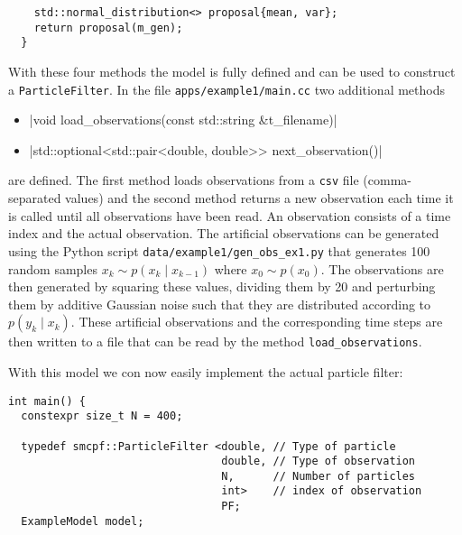 \begin{example}
\begin{verbatim}
    std::normal_distribution<> proposal{mean, var};
    return proposal(m_gen);
  }
\end{verbatim}
  With these four methods the model is fully defined and can be used
  to construct a \texttt{ParticleFilter}. In the file
  \texttt{apps/example1/main.cc} two additional methods
  \begin{itemize}
  \item {}|void load_observations(const std::string
    &t_filename)|
  \item {}|std::optional<std::pair<double, double>>
    next_observation()|
  \end{itemize}
  are defined. The first method loads observations from a \texttt{csv}
  file (comma-separated values) and the second method returns a new
  observation each time it is called until all observations have been
  read. An observation consists of a time index and the actual
  observation. The artificial observations can be generated using the
  Python script \texttt{data/example1/gen\_obs\_ex1.py} that generates
  100 random samples $x_k \sim p(x_k \mid x_{k-1})$ where
  $x_0 \sim p(x_0)$. The observations are then generated by squaring
  these values, dividing them by 20 and perturbing them by additive
  Gaussian noise such that they are distributed according to
  $p(y_k \mid x_k)$. These artificial observations and the
  corresponding time steps are then written to a file that can be read
  by the method \texttt{load\_observations}.

  With this model we con now easily implement the actual particle
  filter:
\begin{verbatim}
int main() {
  constexpr size_t N = 400;

  typedef smcpf::ParticleFilter <double, // Type of particle
                                 double, // Type of observation
                                 N,      // Number of particles
                                 int>    // index of observation
                                 PF;
  ExampleModel model;


\end{verbatim}
\end{example}

